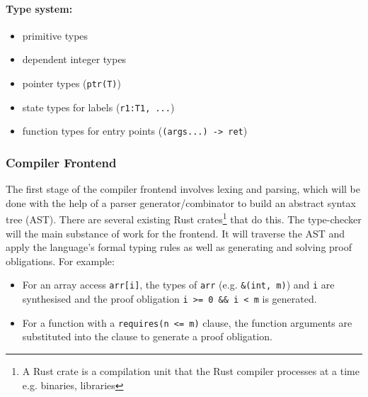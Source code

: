 \documentclass[a4paper, 12pt]{article}
\begin{document}
\paragraph{Type system:}
\begin{itemize}
  \item primitive types
  \item dependent integer types
  \item pointer types (\texttt{ptr(T)})
  \item state types for labels (\texttt{r1:T1, ...})
  \item function types for entry points (\texttt{(args...) -> ret})
\end{itemize}


\subsubsection*{Compiler Frontend}

The first stage of the compiler frontend involves lexing and parsing, which will be done with the help of a parser generator/combinator to build an abstract syntax tree (AST). There are several existing Rust crates\footnote{A Rust crate is a compilation unit that the Rust compiler processes at a time e.g. binaries, libraries} that do this. The type-checker will the main substance of work for the frontend. It will traverse the AST and apply the language's formal typing rules as well as generating and solving proof obligations. For example:

\begin{itemize}
  \item For an array access \texttt{arr[i]}, the types of \texttt{arr} (e.g. \texttt{\&(int, m)}) and \texttt{i} are synthesised and the proof obligation \texttt{i >= 0 \&\& i < m} is generated.
  \item For a function with a \texttt{requires(n <= m)} clause, the function arguments are substituted into the clause to generate a proof obligation.
\end{itemize}
\end{document}
